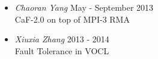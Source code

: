 \begin{itemize}
    \item{\sl Chaoran Yang} \hfill May - September 2013 \\
        CaF-2.0 on top of MPI-3 RMA \\
    \item{\sl Xiuxia Zhang} \hfill 2013 - 2014 \\
        Fault Tolerance in VOCL \\
\end{itemize}
